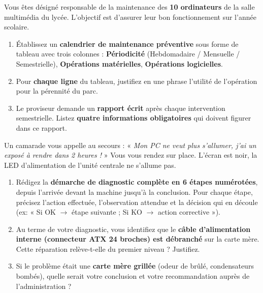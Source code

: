 \documentclass[11pt]{article}
\begin{document}
\begin{exercice}
Vous êtes désigné responsable de la maintenance des \textbf{10 ordinateurs} de la salle multimédia du lycée. L'objectif est d'assurer leur bon fonctionnement sur l'année scolaire.
\begin{enumerate}
    \item Établissez un \textbf{calendrier de maintenance préventive} sous forme de tableau avec trois colonnes : \textbf{Périodicité} (Hebdomadaire / Mensuelle / Semestrielle), \textbf{Opérations matérielles}, \textbf{Opérations logicielles}.
    \item Pour \textbf{chaque ligne} du tableau, justifiez en une phrase l'utilité de l'opération pour la pérennité du parc.
    \item Le proviseur demande un \textbf{rapport écrit} après chaque intervention semestrielle. Listez \textbf{quatre informations obligatoires} qui doivent figurer dans ce rapport.
\end{enumerate}
\end{exercice}

\begin{exercice}
Un camarade vous appelle au secours : « \emph{Mon PC ne veut plus s'allumer, j'ai un exposé à rendre dans 2 heures !} » Vous vous rendez sur place. L'écran est noir, la LED d'alimentation de l'unité centrale ne s'allume pas.
\begin{enumerate}
    \item Rédigez la \textbf{démarche de diagnostic complète en 6 étapes numérotées}, depuis l'arrivée devant la machine jusqu'à la conclusion. Pour chaque étape, précisez l'action effectuée, l'observation attendue et la décision qui en découle (ex: « Si OK $\to$ étape suivante ; Si KO $\to$ action corrective »).
    \item Au terme de votre diagnostic, vous identifiez que le \textbf{câble d'alimentation interne (connecteur ATX 24 broches) est débranché} sur la carte mère. Cette réparation relève-t-elle du premier niveau ? Justifiez.
    \item Si le problème était une \textbf{carte mère grillée} (odeur de brûlé, condensateurs bombés), quelle serait votre conclusion et votre recommandation auprès de l'administration ?
\end{enumerate}
\end{exercice}
\end{document}
